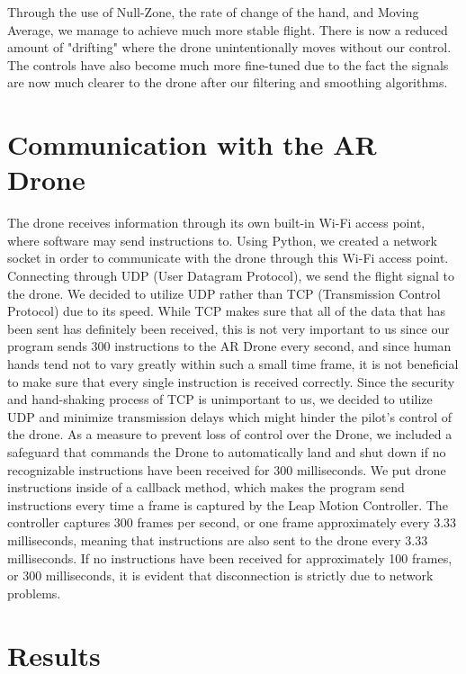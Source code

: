 \documentclass[letterpaper,english, 12pt]{article}
\begin{document}
Through the use of Null-Zone, the rate of change of the hand, and Moving Average, we manage to achieve much more stable flight.  There is now a reduced amount of "drifting" where the drone unintentionally moves without our control.  The controls have also become much more fine-tuned due to the fact the signals are now much clearer to the drone after our filtering and smoothing algorithms.  

\section*{Communication with the AR Drone}

The drone receives information through its own built-in Wi-Fi access point, where software may send instructions to. Using Python, we created a network socket in order to communicate with the drone through this Wi-Fi access point. Connecting through UDP (User Datagram Protocol), we send the flight signal to the drone. We decided to utilize UDP rather than TCP (Transmission Control Protocol) due to its speed. While TCP makes sure that all of the data that has been sent has definitely been received, this is not very important to us since our program sends 300 instructions to the AR Drone every second, and since human hands tend not to vary greatly within such a small time frame, it is not beneficial to make sure that every single instruction is received correctly. Since the security and hand-shaking process of TCP is unimportant to us, we decided to utilize UDP and minimize transmission delays which might hinder the pilot's control of the drone. As a measure to prevent loss of control over the Drone, we included a safeguard that commands the Drone to automatically land and shut down if no recognizable instructions have been received for 300 milliseconds. We put drone instructions inside of a callback method, which makes the program send instructions every time a frame is captured by the Leap Motion Controller. The controller captures 300 frames per second, or one frame approximately every 3.33 milliseconds, meaning that instructions are also sent to the drone every 3.33 milliseconds. If no instructions have been received for approximately 100 frames, or 300 milliseconds, it is evident that disconnection is strictly due to network problems.


\section*{Results}
\end{document}
